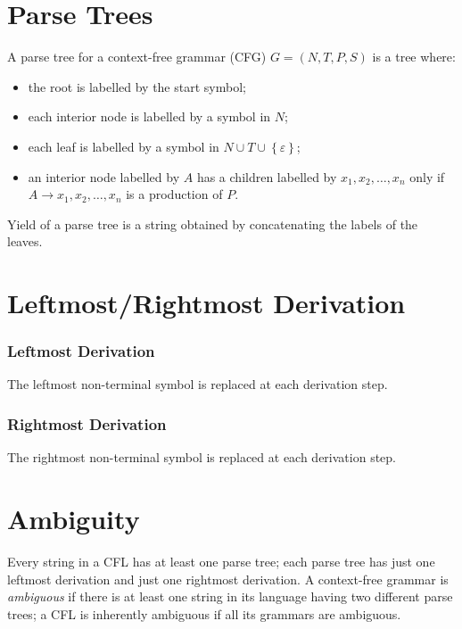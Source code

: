 \section{Parse Trees}
A parse tree for a context-free grammar (CFG) $G = (N, T, P, S)$ is a tree where:
\begin{itemize}
	\item the root is labelled by the start symbol;
	\item each interior node is labelled by a symbol in $N$;
	\item each leaf is labelled by a symbol in $N \cup T \cup \left\{\varepsilon\right\}$;
	\item an interior node labelled by $A$ has a children labelled by $x_1, x_2, \ldots, x_n$ only if $A \to x_1, x_2, \ldots, x_n$ is a production of $P$.
\end{itemize}
Yield of a parse tree is a string obtained by concatenating the labels of the leaves.

\section{Leftmost/Rightmost Derivation}
\subsubsection{Leftmost Derivation}
The leftmost non-terminal symbol is replaced at each derivation step.
\subsubsection{Rightmost Derivation}
The rightmost non-terminal symbol is replaced at each derivation step.

\section{Ambiguity}
Every string in a CFL has at least one parse tree; each parse tree has just one leftmost derivation and just one rightmost derivation.
A context-free grammar is \emph{ambiguous} if there is at least one string in its language having two different parse trees; a CFL is inherently ambiguous if all its grammars are ambiguous.

